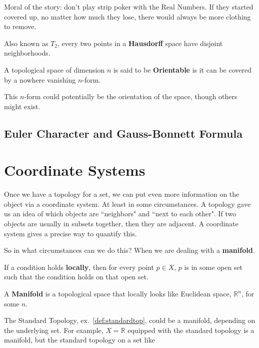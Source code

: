 Moral of the story: don't play strip poker with the Real Numbers. If they started covered up, no matter how much they lose, there would always be more clothing to remove.

\begin{definition}[Hausdorff]
    Also known as \textbf{$T_2$}, every two points in a \textbf{Hausdorff} space have disjoint neighborhoods.
\end{definition}

\begin{definition}[Orientable]
  A topological space of dimension $n$ is said to be \textbf{Orientable} is it can be covered by a nowhere vanishing $n$-form.
\end{definition}
This $n$-form could potentially be the orientation of the space, though others might exist.



\subsection{Euler Character and Gauss-Bonnett Formula}

\section{Coordinate Systems}
Once we have a topology for a set, we can put even more information on the object via a coordinate system. At least in some circumstances. A topology gave us an idea of which objects are ``neighbors" and ``next to each other".  If two objects are usually in subsets together, then they are adjacent.  A coordinate system gives a precise way to quantify this.

So in what circumstances can we do this? When we are dealing with a \textbf{manifold}.

\begin{definition}[locally]
   If a condition holds \textbf{locally}, then for every point $p\in X$, $p$ is in some open set such that the condition holds on that open set.
\end{definition}

\begin{definition}[Manifold]
A \textbf{Manifold} is a topological space that locally looks like Euclidean space, $\mathbb{R}^n$, for some $n$.
\end{definition}

 The Standard Topology, ex.~\ref{def:standardtop}, could be a manifold, depending on the underlying set. For example, $X=\mathbb{R}$ equipped with the standard topology is a manifold, but the standard topology on a set like

